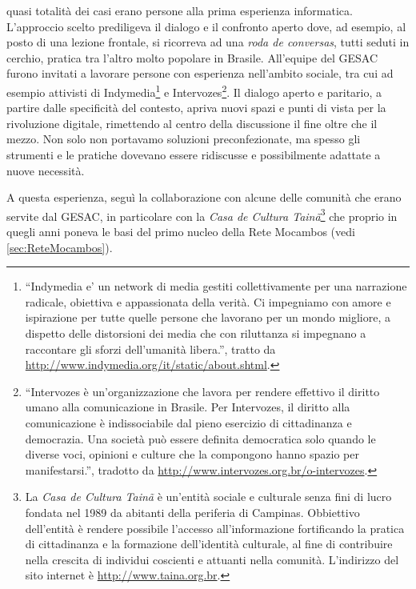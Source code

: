 quasi totalità dei casi erano persone alla prima esperienza
informatica. L'approccio scelto prediligeva il dialogo e il confronto
aperto dove, ad esempio, al posto di una lezione frontale, si
ricorreva ad una \emph{roda de conversas}, tutti seduti in cerchio,
pratica tra l'altro molto popolare in Brasile. All'equipe del GESAC
furono invitati a lavorare persone con esperienza nell'ambito sociale,
tra cui ad esempio attivisti di Indymedia\footnote{``Indymedia e' un
  network di media gestiti collettivamente per una narrazione
  radicale, obiettiva e appassionata della verità. Ci impegniamo con
  amore e ispirazione per tutte quelle persone che lavorano per un
  mondo migliore, a dispetto delle distorsioni dei media che con
  riluttanza si impegnano a raccontare gli sforzi dell'umanità
  libera.'', tratto da
  \url{http://www.indymedia.org/it/static/about.shtml}.} e
Intervozes\footnote{``Intervozes è un'organizzazione che lavora per
  rendere effettivo il diritto umano alla comunicazione in Brasile.
  Per Intervozes, il diritto alla comunicazione è indissociabile dal
  pieno esercizio di cittadinanza e democrazia. Una società può essere
  definita democratica solo quando le diverse voci, opinioni e culture
  che la compongono hanno spazio per manifestarsi.'', tradotto da
  \url{http://www.intervozes.org.br/o-intervozes}.}. Il dialogo aperto
e paritario, a partire dalle specificità del contesto, apriva nuovi
spazi e punti di vista per la rivoluzione digitale, rimettendo al
centro della discussione il fine oltre che il mezzo. Non solo non
portavamo soluzioni preconfezionate, ma spesso gli strumenti e le
pratiche dovevano essere ridiscusse e possibilmente adattate a nuove
necessità.

A questa esperienza, seguì la collaborazione con alcune delle comunità
che erano servite dal GESAC, in particolare con la \emph{Casa de
  Cultura Tainã}\footnote{La \emph{Casa de Cultura Tainã} è un'entità
  sociale e culturale senza fini di lucro fondata nel 1989 da abitanti
  della periferia di Campinas. Obbiettivo dell'entità è rendere
  possibile l'accesso all'informazione fortificando la pratica di
  cittadinanza e la formazione dell'identità culturale, al fine di
  contribuire nella crescita di individui coscienti e attuanti nella
  comunità. L'indirizzo del sito internet è
  \url{http://www.taina.org.br}.} che proprio in quegli anni poneva le
basi del primo nucleo della Rete Mocambos (vedi
\ref{sec:ReteMocambos}).

